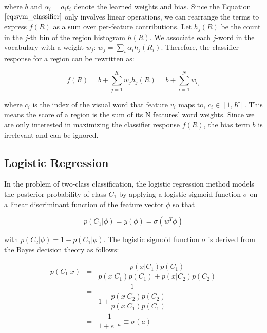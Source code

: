 \documentclass{SMBV12}
\begin{document}
where $b$ and $\alpha_i = a_i t_i$ denote the learned weights and bias. Since the Equation $\ref{eq:svm_classifier}$ only involves linear operations, we can rearrange the terms to express $f(R)$ as a sum over per-feature contributions. Let $h_j(R)$ be the count in the $j$-th bin of the region histogram $h(R)$. We associate each $j$-word in the vocabulary with a weight $w_j$: $w_j = \sum_i \alpha_i h_j(R_i)$. Therefore, the classifier response for a region can be rewritten as:

\begin{equation}
f(R) = b + \sum\limits_{j = 1}^{K} w_j h_j(R) = b + \sum\limits_{i = 1}^{N}w_{c_i}
\label{eq:svm_rank}
\end{equation}

where $c_i$ is the index of the visual word that feature $v_i$ maps to, $c_i \in [1, K]$. This means the score of a region is the sum of its N features' word weights. Since we are only interested in maximizing the classifier response $f(R)$, the bias term $b$ is irrelevant and can be ignored.

\subsection{Logistic Regression}

\label{sec:logistic_regression}

In the problem of two-class classification, the logistic regression method models the posterior probability of class $C_1$ by applying a logistic sigmoid function $\sigma$ on a linear discriminant function of the feature vector $\phi$ so that

\begin{equation}
\label{eq:logistic}
p(C_1|\phi) = y(\phi) = \sigma(w^T\phi)
\end{equation}

with $p(C_2|\phi) = 1 - p(C_1|\phi)$. The logistic sigmoid function $\sigma$ is derived from the Bayes decision theory as follows:

\begin{equation}
\label{eq:Bayes}
\begin{array}{lcl}
p(C_1|x) & = & \dfrac{p(x|C_1)p(C_1)}{p(x|C_1)p(C_1) + p(x|C_2)p(C_2)}\\
		 & = & \dfrac{1}{1 + \dfrac{p(x|C_2)p(C_2)}{p(x|C_1)p(C_1)}}\\
		 & = & \dfrac{1}{1 + e^{-a}} \equiv \sigma(a)
\end{array}
\end{equation}
\end{document}
